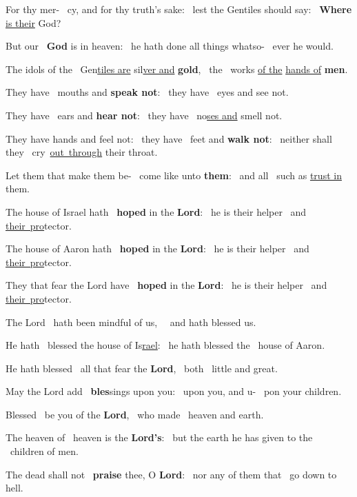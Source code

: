 \documentclass[12pt]{article} %
\newenvironment{psalmtext}{\leftskip 0.25in}{\vspace{2 mm}}
\def\pipe{\textcolor{benred8}{\textdoublepipe}}
\let\oldgresixstar\gresixstar
\renewcommand{\gresixstar}{\textcolor{benred8}{\oldgresixstar}}
\let\oldgredagger\gredagger
\renewcommand{\gredagger}{\textcolor{benred8}{\oldgredagger}}
\begin{document}
\begin{pages}
\begin{Rightside}
\begin{psalmtext}
For thy mer- \pipe\ cy, and for thy truth's sake: \gresixstar\ lest the Gentiles should say: \pipe\ \textbf{Where} \uline{is their} God?

But our \pipe\ \textbf{God} is in heaven: \gresixstar\ he hath done all things whatso- \pipe\ ever he would.

The idols of the \pipe\ Gen\uline{tiles are} sil\uline{ver and} \textbf{gold}, \gresixstar\ the \pipe\ works \uline{of the} \uline{hands of} \textbf{men}.

They have \pipe\ mouths and \textbf{speak not}: \gresixstar\ they have \pipe\ eyes and see not.

They have \pipe\ ears and \textbf{hear not}: \gresixstar\ they have \pipe\ no\uline{ses and} smell not.

They have hands and feel not: \gredagger\ they have \pipe\ feet and \textbf{walk not}: \gresixstar\ neither shall they \pipe\ cry~\uline{out~through} their throat.

Let them that make them be- \pipe\ come like unto \textbf{them}: \gresixstar\ and all \pipe\ such as \uline{trust in} them.

The house of Israel hath \pipe\ \textbf{hoped} in the \textbf{Lord}: \gresixstar\ he is their helper \pipe\ and \uline{their~pro}tector.

The house of Aaron hath \pipe\ \textbf{hoped} in the \textbf{Lord}: \gresixstar\ he is their helper \pipe\ and \uline{their~pro}tector.

They that fear the Lord have \pipe\ \textbf{hoped} in the \textbf{Lord}: \gresixstar\ he is their helper \pipe\ and \uline{their~pro}tector.

The Lord \pipe\ hath been mindful of us, \gresixstar\ \pipe\ and hath blessed us.

He hath \pipe\ blessed the house of Is\uline{rael}: \gresixstar\ he hath blessed the \pipe\ house of Aaron.

He hath blessed \pipe\ all that fear the \textbf{Lord}, \gresixstar\ both \pipe\ little and great.

May the Lord add \pipe\ \textbf{bles}sings upon you: \gresixstar\ upon you, and u- \pipe\ pon your children.

Blessed \pipe\ be you of the \textbf{Lord}, \gresixstar\ who made \pipe\ heaven and earth.

The heaven of \pipe\ heaven is the \textbf{Lord's}: \gresixstar\ but the earth he has given to the \pipe\ children of men.

The dead shall not \pipe\ \textbf{praise} thee, O \textbf{Lord}: \gresixstar\ nor any of them that \pipe\ go down to hell.


\end{psalmtext}
\end{Rightside}
\end{pages}
\end{document}
